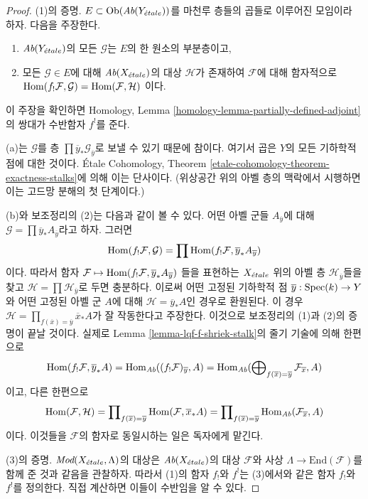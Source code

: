 \begin{proof}
(1)의 증명. $E \subset \mathop{\mathrm{Ob}}\nolimits(\textit{Ab}(Y_{\acute{e}tale}))$를 마천루 층들의
곱들로 이루어진 모임이라 하자. 다음을 주장한다.
\begin{enumerate}
\item[(a)] $\textit{Ab}(Y_{\acute{e}tale})$의 모든 $\mathcal{G}$는 $E$의 한
원소의 부분층이고,
\item[(b)] 모든 $\mathcal{G} \in E$에 대해
$\textit{Ab}(X_{\acute{e}tale})$의 대상 $\mathcal{H}$가 존재하여
$\mathcal{F}$에 대해 함자적으로
$\mathop{\mathrm{Hom}}\nolimits(f_!\mathcal{F}, \mathcal{G}) = \mathop{\mathrm{Hom}}\nolimits(\mathcal{F}, \mathcal{H})$
이다.
\end{enumerate}
이 주장을 확인하면 Homology, Lemma
\ref{homology-lemma-partially-defined-adjoint}의 쌍대가 수반함자
$f^!$를 준다.

\medskip\noindent
(a)는 $\mathcal{G}$를 층
$\prod \overline{y}_*\mathcal{G}_{\overline{y}}$로 보낼 수 있기 때문에
참이다. 여기서 곱은 $Y$의 모든 기하학적 점에 대한 것이다.
\'Etale Cohomology, Theorem
\ref{etale-cohomology-theorem-exactness-stalks}에 의해 이는 단사이다.
(위상공간 위의 아벨 층의 맥락에서 시행하면 이는 고드망 분해의 첫
단계이다.)

\medskip\noindent
(b)와 보조정리의 (2)는 다음과 같이 볼 수 있다. 어떤 아벨 군들
$A_{\overline{y}}$에 대해
$\mathcal{G} = \prod \overline{y}_*A_{\overline{y}}$라고 하자. 그러면
$$
\mathop{\mathrm{Hom}}\nolimits(f_!\mathcal{F}, \mathcal{G}) =
\prod \mathop{\mathrm{Hom}}\nolimits(f_!\mathcal{F}, \overline{y}_*A_{\overline{y}})
$$
이다. 따라서 함자
$\mathcal{F} \mapsto \mathop{\mathrm{Hom}}\nolimits(f_!\mathcal{F}, \overline{y}_*A_{\overline{y}})$
들을 표현하는 $X_{\acute{e}tale}$ 위의 아벨 층
$\mathcal{H}_{\overline{y}}$들을 찾고
$\mathcal{H} = \prod \mathcal{H}_{\overline{y}}$로 두면 충분하다.
이로써 어떤 고정된 기하학적 점
$\overline{y} : \mathop{\mathrm{Spec}}(k) \to Y$와 어떤 고정된 아벨 군 $A$에 대해
$\mathcal{H} = \overline{y}_*A$인 경우로 환원된다. 이 경우
$\mathcal{H} = \prod_{f(\overline{x}) = \overline{y}} \overline{x}_*A$가
잘 작동한다고 주장한다. 이것으로 보조정리의 (1)과 (2)의 증명이
끝날 것이다. 실제로 Lemma \ref{lemma-lqf-f-shriek-stalk}의 줄기
기술에 의해 한편으로
$$
\mathop{\mathrm{Hom}}\nolimits(f_!\mathcal{F}, \overline{y}_*A) =
\mathop{\mathrm{Hom}}\nolimits_{\textit{Ab}}((f_!\mathcal{F})_{\overline{y}}, A) =
\mathop{\mathrm{Hom}}\nolimits_{\textit{Ab}}(\bigoplus\nolimits_{f(\overline{x}) = \overline{y}}
\mathcal{F}_{\overline{x}}, A)
$$
이고, 다른 한편으로
$$
\mathop{\mathrm{Hom}}\nolimits(\mathcal{F}, \mathcal{H}) =
\prod\nolimits_{f(\overline{x}) = \overline{y}}
\mathop{\mathrm{Hom}}\nolimits(\mathcal{F}, \overline{x}_*A) =
\prod\nolimits_{f(\overline{x}) = \overline{y}}
\mathop{\mathrm{Hom}}\nolimits_{\textit{Ab}}(\mathcal{F}_{\overline{x}}, A)
$$
이다. 이것들을 $\mathcal{F}$의 함자로 동일시하는 일은 독자에게 맡긴다.

\medskip\noindent
(3)의 증명. $\textit{Mod}(X_{\acute{e}tale}, \Lambda)$의 대상은
$\textit{Ab}(X_{\acute{e}tale})$의 대상 $\mathcal{F}$와 사상
$\Lambda \to \text{End}(\mathcal{F})$를 함께 준 것과 같음을 관찰하자.
따라서 (1)의 함자 $f_!$와 $f^!$는 (3)에서와 같은 함자 $f_!$와
$f^!$를 정의한다. 직접 계산하면 이들이 수반임을 알 수 있다.
\end{proof}

